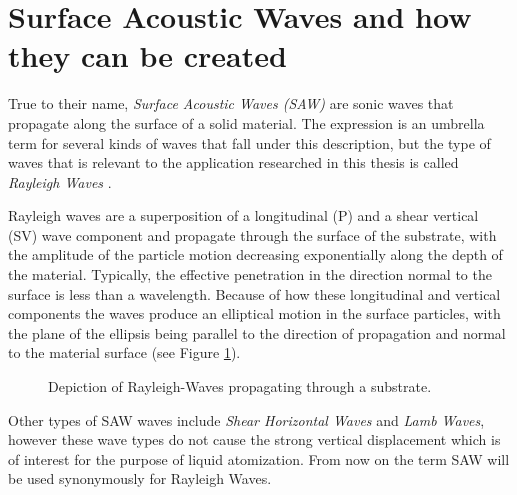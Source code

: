 \section{Surface Acoustic Waves and how they can be created}

True to their name, \emph{Surface Acoustic Waves (SAW)} are sonic waves that propagate along the surface of a solid material. 
The expression is an umbrella term for several kinds of waves that fall under this description, but the type of waves that is relevant to the application researched in this thesis is called \emph{Rayleigh Waves} \cite{mandalSurfaceAcousticWave2022}.

Rayleigh waves are a superposition of a longitudinal (P) and a shear vertical (SV) wave component and propagate through the surface of the substrate, with the amplitude of the particle motion decreasing exponentially along the depth of the material. 
Typically, the effective penetration in the direction normal to the surface is less than a wavelength. 
Because of how these longitudinal and vertical components the waves produce an elliptical motion in the surface particles, with the plane of the ellipsis being parallel to the direction of propagation and normal to the material surface (see Figure \ref{fig:rayleigh}).

\begin{figure}[htbp]
    \centering
    \caption{Depiction of Rayleigh-Waves propagating through a substrate. \cite{mandalSurfaceAcousticWave2022}}
    \label{fig:rayleigh}
\end{figure}

Other types of SAW waves include \emph{Shear Horizontal Waves} and \emph{Lamb Waves}, however these wave types do not cause the strong vertical displacement which is of interest for the purpose of liquid atomization. From now on the term SAW will be used synonymously for Rayleigh Waves.

